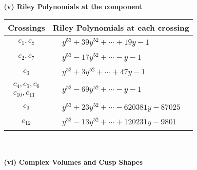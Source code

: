 \documentclass[1p]{elsarticle_modified}
\theoremstyle{definition}
\begin{document}
\newpage\renewcommand{\arraystretch}{1}
\flushleft \textbf{(v) Riley Polynomials at the component}\newline \\
\begin{tabular}{m{50pt}|m{274pt}}
Crossings & \hspace{64pt}Riley Polynomials at each crossing \\
\hline $$\begin{aligned}c_{1},c_{8}\end{aligned}$$&$\begin{aligned}
&y^{53}+39 y^{52}+\cdots+19 y-1
\end{aligned}$\\
\hline $$\begin{aligned}c_{2},c_{7}\end{aligned}$$&$\begin{aligned}
&y^{53}-17 y^{52}+\cdots- y-1
\end{aligned}$\\
\hline $$\begin{aligned}c_{3}\end{aligned}$$&$\begin{aligned}
&y^{53}+3 y^{52}+\cdots+47 y-1
\end{aligned}$\\
\hline $$\begin{aligned}c_{4},c_{5},c_{6}\\c_{10},c_{11}\end{aligned}$$&$\begin{aligned}
&y^{53}-69 y^{52}+\cdots- y-1
\end{aligned}$\\
\hline $$\begin{aligned}c_{9}\end{aligned}$$&$\begin{aligned}
&y^{53}+23 y^{52}+\cdots-620381 y-87025
\end{aligned}$\\
\hline $$\begin{aligned}c_{12}\end{aligned}$$&$\begin{aligned}
&y^{53}-13 y^{52}+\cdots+120231 y-9801
\end{aligned}$\\
\hline
\end{tabular}\\~\\
\newpage\flushleft \textbf{(vi) Complex Volumes and Cusp Shapes}
\end{document}
